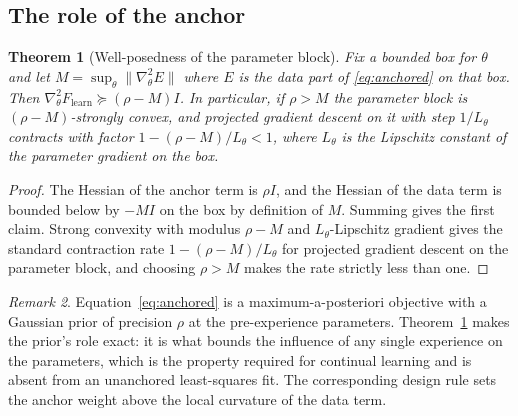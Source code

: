 \documentclass[11pt]{article}
\newtheorem{theorem}{Theorem}
\theoremstyle{definition}
\theoremstyle{remark}
\newtheorem{remark}[theorem]{Remark}
\begin{document}
\subsection{The role of the anchor}
\begin{theorem}[Well-posedness of the parameter block]
\label{thm:anchor}
Fix a bounded box for $\theta$ and let $M=\sup_{\theta}\|\nabla_\theta^2 E\|$ where $E$ is the data
part of \eqref{eq:anchored} on that box. Then
$\nabla_\theta^2 F_{\text{learn}}\succeq(\rho-M)I$. In particular, if $\rho>M$ the parameter block is
$(\rho-M)$-strongly convex, and projected gradient descent on it with step $1/L_\theta$ contracts with
factor $1-(\rho-M)/L_\theta<1$, where $L_\theta$ is the Lipschitz constant of the parameter gradient on
the box.
\end{theorem}
\begin{proof}
The Hessian of the anchor term is $\rho I$, and the Hessian of the data term is bounded below by
$-MI$ on the box by definition of $M$. Summing gives the first claim. Strong convexity with modulus
$\rho-M$ and $L_\theta$-Lipschitz gradient gives the standard contraction rate
$1-(\rho-M)/L_\theta$ for projected gradient descent on the parameter block, and choosing $\rho>M$
makes the rate strictly less than one.
\end{proof}

\begin{remark}
Equation~\eqref{eq:anchored} is a maximum-a-posteriori objective with a Gaussian prior of precision
$\rho$ at the pre-experience parameters. Theorem~\ref{thm:anchor} makes the prior's role exact: it is
what bounds the influence of any single experience on the parameters, which is the property required
for continual learning and is absent from an unanchored least-squares fit. The corresponding design
rule sets the anchor weight above the local curvature of the data term.
\end{remark}
\end{document}

